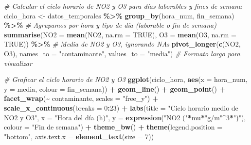 \documentclass[notspecified,article,submit,oneauthor,pdftex]{Definitions/mdpi}
\newenvironment{Shaded}{\begin{snugshade}}{\end{snugshade}}
\newcommand{\AttributeTok}[1]{\textcolor[rgb]{0.13,0.29,0.53}{#1}}
\newcommand{\CommentTok}[1]{\textcolor[rgb]{0.56,0.35,0.01}{\textit{#1}}}
\newcommand{\ConstantTok}[1]{\textcolor[rgb]{0.56,0.35,0.01}{#1}}
\newcommand{\DecValTok}[1]{\textcolor[rgb]{0.00,0.00,0.81}{#1}}
\newcommand{\FunctionTok}[1]{\textcolor[rgb]{0.13,0.29,0.53}{\textbf{#1}}}
\newcommand{\NormalTok}[1]{#1}
\newcommand{\OtherTok}[1]{\textcolor[rgb]{0.56,0.35,0.01}{#1}}
\newcommand{\SpecialCharTok}[1]{\textcolor[rgb]{0.81,0.36,0.00}{\textbf{#1}}}
\newcommand{\StringTok}[1]{\textcolor[rgb]{0.31,0.60,0.02}{#1}}
\begin{document}
\begin{Shaded}
\begin{Highlighting}[]
\CommentTok{\# Calcular el ciclo horario de NO2 y O3 para días laborables y fines de semana}
\NormalTok{ciclo\_hora }\OtherTok{\textless{}{-}}\NormalTok{ datos\_temporales }\SpecialCharTok{\%\textgreater{}\%}
  \FunctionTok{group\_by}\NormalTok{(hora\_num, fin\_semana) }\SpecialCharTok{\%\textgreater{}\%}  \CommentTok{\# Agrupamos por hora y tipo de día (laborable o fin de semana)}
  \FunctionTok{summarise}\NormalTok{(}\AttributeTok{NO2 =} \FunctionTok{mean}\NormalTok{(NO2, }\AttributeTok{na.rm =} \ConstantTok{TRUE}\NormalTok{), }\AttributeTok{O3 =} \FunctionTok{mean}\NormalTok{(O3, }\AttributeTok{na.rm =} \ConstantTok{TRUE}\NormalTok{)) }\SpecialCharTok{\%\textgreater{}\%}  \CommentTok{\# Media de NO2 y O3, ignorando NAs}
  \FunctionTok{pivot\_longer}\NormalTok{(}\FunctionTok{c}\NormalTok{(NO2, O3), }\AttributeTok{names\_to =} \StringTok{"contaminante"}\NormalTok{, }\AttributeTok{values\_to =} \StringTok{"media"}\NormalTok{)  }\CommentTok{\# Formato largo para visualizar}

\CommentTok{\# Graficar el ciclo horario de NO2 y O3}
\FunctionTok{ggplot}\NormalTok{(ciclo\_hora, }\FunctionTok{aes}\NormalTok{(}\AttributeTok{x =}\NormalTok{ hora\_num, }\AttributeTok{y =}\NormalTok{ media, }\AttributeTok{colour =}\NormalTok{ fin\_semana)) }\SpecialCharTok{+}
  \FunctionTok{geom\_line}\NormalTok{() }\SpecialCharTok{+} \FunctionTok{geom\_point}\NormalTok{() }\SpecialCharTok{+}
  \FunctionTok{facet\_wrap}\NormalTok{(}\SpecialCharTok{\textasciitilde{}}\NormalTok{ contaminante, }\AttributeTok{scales =} \StringTok{"free\_y"}\NormalTok{) }\SpecialCharTok{+}
  \FunctionTok{scale\_x\_continuous}\NormalTok{(}\AttributeTok{breaks =} \DecValTok{0}\SpecialCharTok{:}\DecValTok{23}\NormalTok{) }\SpecialCharTok{+}
  \FunctionTok{labs}\NormalTok{(}\AttributeTok{title =} \StringTok{"Ciclo horario medio de NO2 y O3"}\NormalTok{, }\AttributeTok{x =} \StringTok{"Hora del día (h)"}\NormalTok{,}
       \AttributeTok{y =}  \FunctionTok{expression}\NormalTok{(}\StringTok{"NO2 ("}\SpecialCharTok{*}\NormalTok{mu}\SpecialCharTok{*}\StringTok{"g/m"}\SpecialCharTok{\^{}}\DecValTok{3}\SpecialCharTok{*}\StringTok{")"}\NormalTok{), }\AttributeTok{colour =} \StringTok{"Fin de semana"}\NormalTok{) }\SpecialCharTok{+}
  \FunctionTok{theme\_bw}\NormalTok{() }\SpecialCharTok{+}
  \FunctionTok{theme}\NormalTok{(}\AttributeTok{legend.position =} \StringTok{"bottom"}\NormalTok{, }\AttributeTok{axis.text.x =} \FunctionTok{element\_text}\NormalTok{(}\AttributeTok{size =} \DecValTok{7}\NormalTok{))}
\end{Highlighting}
\end{Shaded}
\end{document}
